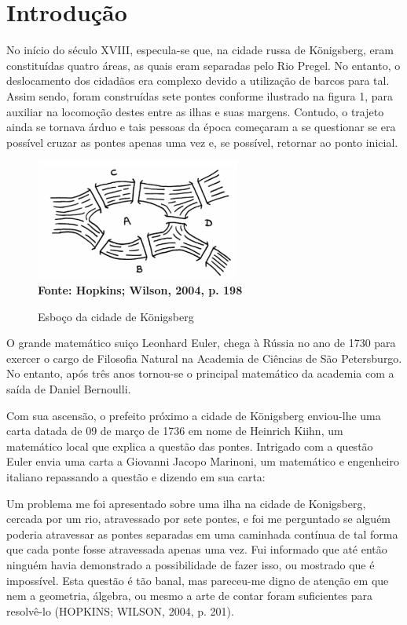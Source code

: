 \section{\esp Introdução}

No início do século XVIII, especula-se que, na cidade russa de Königsberg, eram constituídas quatro áreas, as quais eram separadas pelo Rio Pregel. No entanto, o deslocamento dos cidadãos era complexo devido a utilização de barcos para tal. Assim sendo, foram construídas sete pontes conforme ilustrado na figura 1, para auxiliar na locomoção destes entre as ilhas e suas margens. Contudo, o trajeto ainda se tornava árduo e tais pessoas da época começaram a se questionar se era possível cruzar as pontes apenas uma vez e, se possível, retornar ao ponto inicial.

\begin{figure}[ht]
	\centering	
	\caption[\hspace{0.1cm}Esboço da cidade de Königsberg.]{Esboço da cidade de Königsberg}
	\vspace{-0.4cm}
	\includegraphics[width=0.6\textwidth]{figuras/cidade.png}
	 \vspace{-0.2cm}
	\\\textbf{\footnotesize Fonte: Hopkins; Wilson, 2004, p. 198}
	\label{fig:figura1}
\end{figure}

O grande matemático suiço Leonhard Euler, chega à Rússia no ano de 1730 para exercer o cargo de Filosofia Natural na Academia de Ciências de São Petersburgo. No entanto, após três anos tornou-se o principal matemático da academia com a saída de Daniel Bernoulli.

Com sua ascensão, o prefeito próximo a cidade de Königsberg enviou-lhe uma carta datada de 09 de março de 1736 em nome de Heinrich Kiihn, um matemático local que explica a questão das pontes. Intrigado com a questão Euler envia uma carta a Giovanni Jacopo Marinoni, um matemático e engenheiro italiano repassando a questão e dizendo em sua carta:

\begin{citacaodireta}
Um problema me foi apresentado sobre uma ilha na cidade de Konigsberg, cercada por um rio, atravessado por sete pontes, e foi me perguntado se alguém poderia atravessar as pontes separadas em uma caminhada contínua de tal forma que cada ponte fosse atravessada apenas uma vez. Fui informado que até então ninguém havia demonstrado a possibilidade de fazer isso, ou mostrado que é impossível. Esta questão é tão banal, mas pareceu-me digno de atenção em que nem a geometria, álgebra, ou mesmo a arte de contar foram suficientes para resolvê-lo (HOPKINS; WILSON, 2004, p. 201).
\end{citacaodireta}

